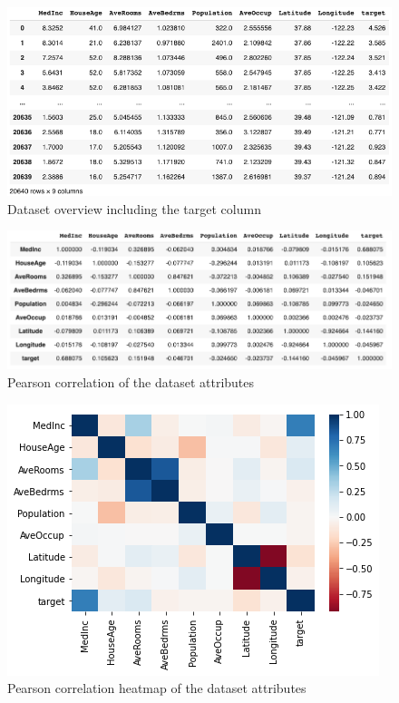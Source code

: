 \documentclass[conference]{IEEEtran}
\begin{document}
\begin{figure}[htbp]
	\includegraphics [scale=0.5]{figures/overview_dataset_with_target.png}
	\caption{Dataset overview including the target column}
	\label{fig:overview_dataset_with_target}
\end{figure}

\begin{figure}[htbp]
	\includegraphics [scale=0.5]{figures/pearson_correlation_of_the_dataset.png}
	\caption{Pearson correlation of the dataset attributes}
	\label{fig:pearson_correlation_of_the_dataset}
\end{figure}

\newpage
\begin{figure}[htbp]
	\includegraphics [scale=0.5]{figures/correlation_heatmap.png}
	\caption{Pearson correlation heatmap of the dataset attributes}
	\label{fig:correlation_heatmap}
\end{figure}
\end{document}
